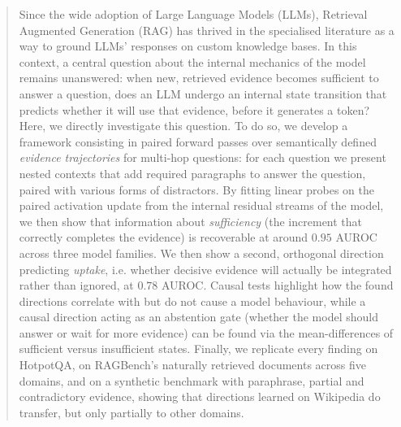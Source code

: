 \begin{abstract}
Since the wide adoption of Large Language Models (LLMs), Retrieval Augmented Generation (RAG) has thrived in the specialised literature as a way to ground LLMs' responses on custom knowledge bases. In this context, a central question about the internal mechanics of the model remains unanswered: when new, retrieved evidence becomes sufficient to answer a question, does an LLM undergo an internal state transition that predicts whether it will use that evidence, before it generates a token? Here, we directly investigate this question. To do so, we develop a framework consisting in paired forward passes over semantically defined \emph{evidence trajectories} for multi-hop questions: for each question we present nested contexts that add required paragraphs to answer the question, paired with various forms of distractors. By fitting linear probes on the paired activation update from the internal residual streams of the model, we then show that information about \emph{sufficiency} (the increment that correctly completes the evidence) is recoverable at around $0.95$ AUROC across three model families. We then show a second, orthogonal direction predicting \emph{uptake}, i.e. whether decisive evidence will actually be integrated rather than ignored, at $0.78$ AUROC. Causal tests highlight how the found directions correlate with but do not cause a model behaviour, while a causal direction acting as an abstention gate (whether the model should answer or wait for more evidence) can be found via the mean-differences of sufficient versus insufficient states.
Finally,  we replicate every finding on HotpotQA, on RAGBench's naturally retrieved documents across five domains, and on a synthetic benchmark with paraphrase, partial and contradictory evidence, showing that directions learned on Wikipedia do transfer, but only partially to other domains.
\end{abstract}

